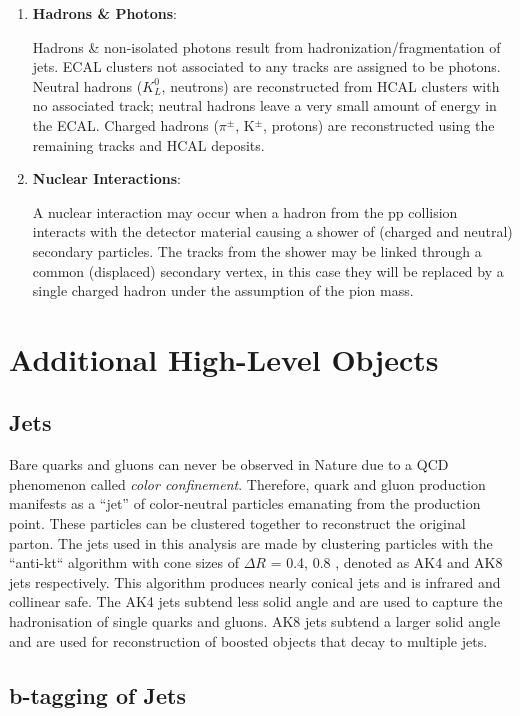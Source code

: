 \begin{enumerate}
\item \textbf{Hadrons \& Photons}:

Hadrons \& non-isolated photons result from hadronization/fragmentation of jets. ECAL clusters not associated to any tracks are assigned to be photons. Neutral hadrons ($K^{0}_{L}$, neutrons) are reconstructed from HCAL clusters with no associated track; neutral hadrons leave a very small amount of energy in the ECAL. Charged hadrons ($\pi^{\pm}$, K$^{\pm}$, protons) are reconstructed using the remaining tracks and HCAL deposits.

\item \textbf{Nuclear Interactions}:

A nuclear interaction may occur when a hadron from the pp collision interacts with the detector material causing a shower of (charged and neutral) secondary particles. The tracks from the shower may be linked through a common (displaced) secondary vertex, in this case they will be replaced by a single charged hadron under the assumption of the pion mass.

\end{enumerate}

\section{Additional High-Level Objects}

\subsection{Jets}

Bare quarks and gluons can never be observed in Nature due to a QCD phenomenon called \textit{color confinement}. Therefore, quark and gluon production manifests as a ``jet'' of color-neutral particles emanating from the production point. These particles can be clustered together to reconstruct the original parton. The jets used in this analysis are made by clustering particles with the ``anti-kt`` algorithm with cone sizes of $\Delta R$ = 0.4, 0.8 \cite{1126-6708-2008-04-063}, denoted as AK4 and AK8 jets respectively. This algorithm produces nearly conical jets and is infrared and collinear safe. The AK4 jets subtend less solid angle and are used to capture the hadronisation of single quarks and gluons. AK8 jets subtend a larger solid angle and are used for reconstruction of boosted objects that decay to multiple jets.

\subsection{b-tagging of Jets}

